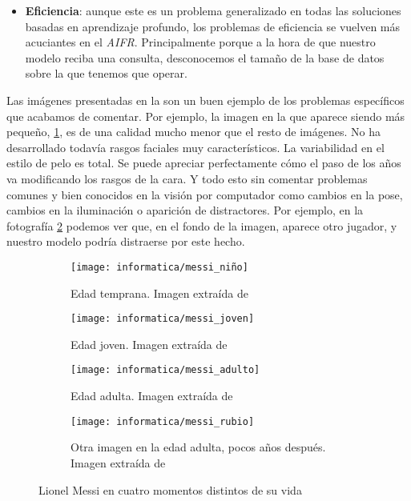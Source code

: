 \begin{itemize}
	\item \textbf{Eficiencia}: aunque este es un problema generalizado en todas las soluciones basadas en aprendizaje profundo, los problemas de eficiencia se vuelven más acuciantes en el \textit{AIFR}. Principalmente porque a la hora de que nuestro modelo reciba una consulta, desconocemos el tamaño de la base de datos sobre la que tenemos que operar.
\end{itemize}

Las imágenes presentadas en la  son un buen ejemplo de los problemas específicos que acabamos de comentar. Por ejemplo, la imagen en la que aparece siendo más pequeño, \ref{img:messi_pequeno}, es de una calidad mucho menor que el resto de imágenes. No ha desarrollado todavía rasgos faciales muy característicos. La variabilidad en el estilo de pelo es total. Se puede apreciar perfectamente cómo el paso de los años va modificando los rasgos de la cara. Y todo esto sin comentar problemas comunes y bien conocidos en la visión por computador como cambios en la pose, cambios en la iluminación o aparición de distractores. Por ejemplo, en la fotografía \ref{img:messi_adulto} podemos ver que, en el fondo de la imagen, aparece otro jugador, y nuestro modelo podría distraerse por este hecho.

\begin{figure}[H]
	\centering
	\begin{subfigure}{0.5\textwidth}
		\centering
		\texttt{[image: informatica/messi\_niño]}
		\caption{Edad temprana. Imagen extraída de \cite{informatica:webimg_messi_pequeno}}
		\label{img:messi_pequeno}
	\end{subfigure}%
	\begin{subfigure}{.5\textwidth}
		\centering
		\texttt{[image: informatica/messi\_joven]}
		\caption{Edad joven. Imagen extraída de \cite{informatica:webimg_messi_joven}}
	\end{subfigure}%

	\begin{subfigure}{.5\textwidth}
		\centering
		\texttt{[image: informatica/messi\_adulto]}
		\caption{Edad adulta. Imagen extraída de \cite{informatica:webimg_messi_adulto}}
		\label{img:messi_adulto}
	\end{subfigure}%
	\begin{subfigure}{.5\textwidth}
		\centering
		\texttt{[image: informatica/messi\_rubio]}
		\caption{Otra imagen en la edad adulta, pocos años después. Imagen extraída de \cite{informatica:webimg_messi_rubio}}
	\end{subfigure}

	\caption{Lionel Messi en cuatro momentos distintos de su vida}
	\label{img:messi_cuatro_edades}

\end{figure}

